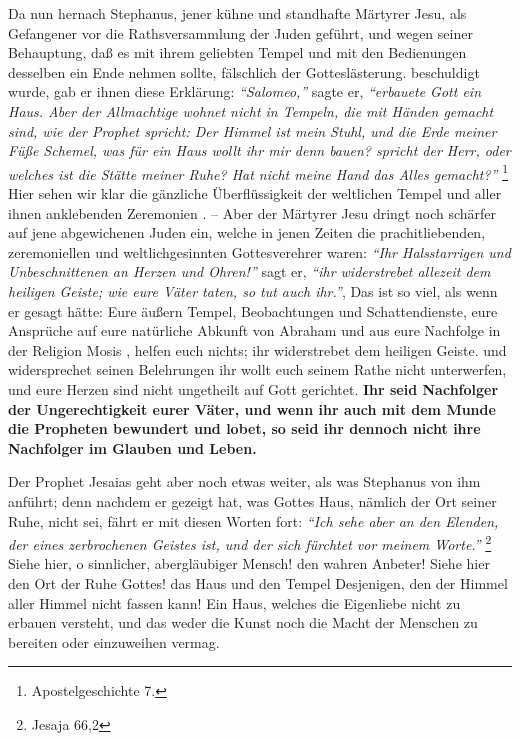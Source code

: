   
Da nun hernach Stephanus, jener kühne und standhafte Märtyrer Jesu, als
Gefangener vor die Rathsversammlung der Juden geführt, und wegen seiner
Behauptung, daß es mit ihrem geliebten Tempel und mit den Bedienungen desselben
ein Ende nehmen sollte, fälschlich der Gotteslästerung. 
beschuldigt wurde, gab
er ihnen diese Erklärung:
\textit{"`Salomeo,"'}  sagte er,
\textit{"`erbauete Gott ein Haus. Aber der Allmachtige wohnet nicht in Tempeln,
die mit Händen gemacht sind, wie der Prophet spricht: Der Himmel ist mein Stuhl,
und die Erde meiner Füße Schemel, was für ein Haus wollt ihr mir denn bauen?
spricht der Herr, oder welches ist die Stätte meiner Ruhe? Hat nicht meine Hand
das Alles gemacht?"'}
\footnote{Apostelgeschichte 7.}
Hier sehen wir klar die gänzliche Überflüssigkeit der weltlichen
Tempel und aller ihnen anklebenden Zeremonien . -- Aber der
Märtyrer Jesu  dringt
noch schärfer auf jene abgewichenen Juden ein, welche in jenen Zeiten die
prachitliebenden, zeremoniellen und weltlichgesinnten Gottesverehrer waren:
\textit{"`Ihr Halsstarrigen und Unbeschnittenen an Herzen und Ohren!"'} sagt er,
\textit{"`ihr widerstrebet allezeit dem heiligen Geiste; wie eure Väter taten,
so tut auch
ihr."'}, Das ist so viel, als wenn er gesagt hätte: Eure äußern Tempel,
Beobachtungen und Schattendienste, eure Ansprüche auf eure natürliche Abkunft
von Abraham   und aus eure Nachfolge in der Religion
Mosis , helfen euch nichts;
ihr widerstrebet dem heiligen Geiste. und widersprechet seinen Belehrungen ihr
wollt euch seinem Rathe nicht unterwerfen, und eure Herzen sind nicht ungetheilt
auf Gott gerichtet. \textbf{Ihr seid Nachfolger der Ungerechtigkeit eurer Väter,
und
wenn ihr auch mit dem Munde die Propheten bewundert und lobet, so seid ihr
dennoch nicht ihre Nachfolger im Glauben und Leben.} 

\medskip

Der Prophet Jesaias  geht aber noch etwas weiter, als
was Stephanus von ihm
anführt; denn nachdem er gezeigt hat, was Gottes Haus, nämlich der Ort seiner
Ruhe, nicht sei, fährt er mit diesen Worten fort:
\textit{"`Ich sehe aber an den Elenden, der eines zerbrochenen Geistes ist, und
der sich fürchtet vor meinem Worte."'}
\footnote{Jesaja 66,2}
Siehe hier, o sinnlicher, abergläubiger Mensch! den
wahren Anbeter! Siehe hier den Ort der Ruhe Gottes! das Haus und den Tempel
Desjenigen, den der Himmel aller Himmel nicht fassen kann! Ein Haus, welches
die Eigenliebe nicht zu erbauen versteht, und das weder die Kunst noch die Macht
der Menschen zu bereiten oder einzuweihen vermag.

